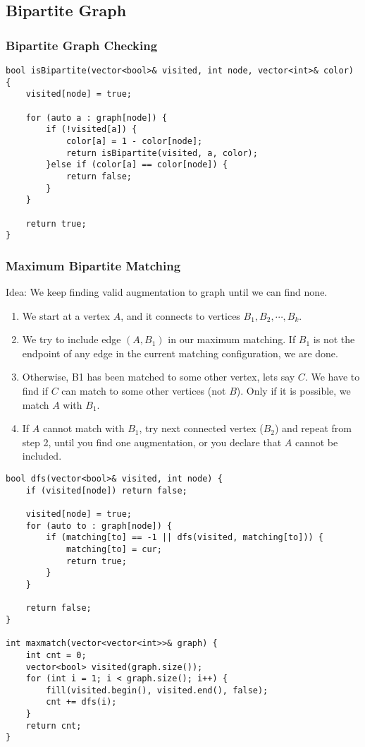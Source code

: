 \subsection{Bipartite Graph}
\subsubsection{Bipartite Graph Checking}
\begin{lstlisting}
bool isBipartite(vector<bool>& visited, int node, vector<int>& color) {
    visited[node] = true;

    for (auto a : graph[node]) {
        if (!visited[a]) {
            color[a] = 1 - color[node];
            return isBipartite(visited, a, color);
        }else if (color[a] == color[node]) {
            return false;
        }
    }

    return true;
}
\end{lstlisting}

\subsubsection{Maximum Bipartite Matching}
Idea: We keep finding valid augmentation to graph until we can find none.

\begin{enumerate}
    \item We start at a vertex $A$, and it connects to vertices $B_1, B_2, \cdots, B_k$.
    \item We try to include edge $(A, B_1)$ in our maximum matching. 
    If $B_1$ is not the endpoint of any edge in the current matching configuration, 
    we are done.
    \item Otherwise, B1 has been matched to some other vertex, lets say $C$. 
    We have to find if $C$ can match to some other vertices (not $B$). 
    Only if it is possible, we match $A$ with $B_1$.
    \item If $A$ cannot match with $B_1$, try next connected vertex ($B_2$) and repeat from step 2, 
    until you find one augmentation, or you declare that $A$ cannot be included.
\end{enumerate}

\begin{lstlisting}
bool dfs(vector<bool>& visited, int node) {
    if (visited[node]) return false;

    visited[node] = true;
    for (auto to : graph[node]) {
        if (matching[to] == -1 || dfs(visited, matching[to])) {
            matching[to] = cur;
            return true;
        }
    }

    return false;
}

int maxmatch(vector<vector<int>>& graph) {
    int cnt = 0;
    vector<bool> visited(graph.size());
    for (int i = 1; i < graph.size(); i++) {
        fill(visited.begin(), visited.end(), false);
        cnt += dfs(i);
    }
    return cnt;
}
\end{lstlisting}